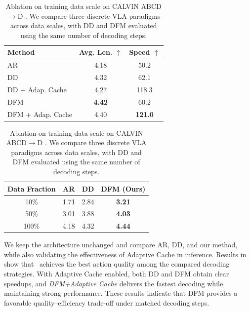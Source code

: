 \begin{table}[t]
    \centering
    \footnotesize
    \begin{minipage}[t]{0.47\textwidth}
        \centering
        \setlength{\tabcolsep}{2pt}
        \caption{Inference efficiency comparison across AR, DD, and DFM on CALVIN ABCD$\rightarrow$D. DD and DFM use the same decoding steps (16).}
        \label{tab:efficiency_main}
        \begin{tabular}{l|c|c}
            \toprule
            Method & Avg. Len. $\uparrow$ & Speed $\uparrow$ \\
            \midrule
            AR & 4.18 & 50.2  \\
            DD & 4.32 & 62.1  \\
            DD + Adap. Cache & 4.27 & 118.3  \\
            DFM & \textbf{4.42} & 60.2  \\
            DFM + Adap. Cache & 4.40 & \textbf{121.0}  \\
            \bottomrule
        \end{tabular}
    \end{minipage}\hfill
    \begin{minipage}[t]{0.47\textwidth}
        \centering
        \setlength{\tabcolsep}{2pt}
        \caption{Ablation on training data scale on CALVIN ABCD$\rightarrow$D . We compare three discrete VLA paradigms across data scales, with DD and DFM evaluated using the same number of decoding steps.}
        \label{tab:ablation_data_scale}
        \begin{tabular}{c|ccc}
            \toprule
            Data Fraction & AR & DD & DFM (Ours) \\
            \midrule
            10\%  & 1.71 & 2.84 & \textbf{3.21}   \\
            50\%  & 3.01 & 3.88 & \textbf{4.03}   \\
            100\% & 4.18 & 4.32 & \textbf{4.44}   \\
            \bottomrule
        \end{tabular}
    \end{minipage}
\end{table}
We keep the architecture unchanged and compare AR, DD, and our method, while also validating the effectiveness of Adaptive Cache in inference.
Results in  show that \method~achieves the best action quality among the compared decoding strategies. With Adaptive Cache enabled, both DD and DFM obtain clear speedups, and \textit{DFM+Adaptive Cache} delivers the fastest decoding while maintaining strong performance. These results indicate that DFM provides a favorable quality--efficiency trade-off under matched decoding steps.

